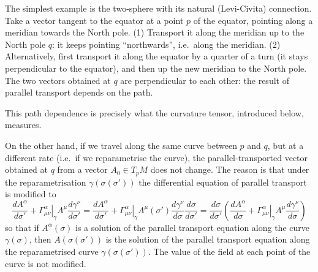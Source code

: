 \begin{points}
\begin{carroll}
The simplest example is the two-sphere with its natural (Levi-Civita) connection. Take a vector tangent to the equator at a point $p$ of the equator, pointing along a meridian towards the North pole. (1) Transport it along the meridian up to the North pole $q$: it keeps pointing ``northwards'', i.e.\ along the meridian. (2) Alternatively, first transport it along the equator by a quarter of a turn (it stays perpendicular to the equator), and then up the new meridian to the North pole. The two vectors obtained at $q$ are perpendicular to each other: the result of parallel transport depends on the path.
\begin{center}
\end{center}
This path dependence is precisely what the curvature tensor, introduced below, measures.
\end{carroll}


\item On the other hand, if we travel along the same curve between $p$ and $q$, but at a different rate (i.e.\ if we reparametrise the curve), the parallel-transported vector obtained at $q$ from a vector $A_0\in T_pM$ does not change. The reason is that under the reparametrisation $\gamma(\sigma(\sigma'))$ the differential equation of parallel transport is modified to
\[
  \frac{dA^\alpha}{d\sigma'}+\left.\Gamma^\alpha_{\mu\nu}\right|_\gamma A^\mu\frac{d\gamma^\nu}{d\sigma'}=\frac{dA^\alpha}{d\sigma'}+\left.\Gamma^\alpha_{\mu\nu}\right|_\gamma A^\mu(\sigma')\frac{d\gamma^\nu}{d\sigma}\frac{d\sigma}{d\sigma'}=\frac{d\sigma}{d\sigma'}\left(\frac{dA^\alpha}{d\sigma}+\left.\Gamma^\alpha_{\mu\nu}\right|_\gamma A^\mu\frac{d\gamma^\nu}{d\sigma}\right)
\]
so that if $A^\alpha(\sigma)$ is a solution of the parallel transport equation along the curve $\gamma(\sigma)$, then $A(\sigma(\sigma'))$ is the solution of the parallel transport equation along the reparametrised curve $\gamma(\sigma(\sigma'))$. The value of the field at each point of the curve is not modified.
\end{points}

